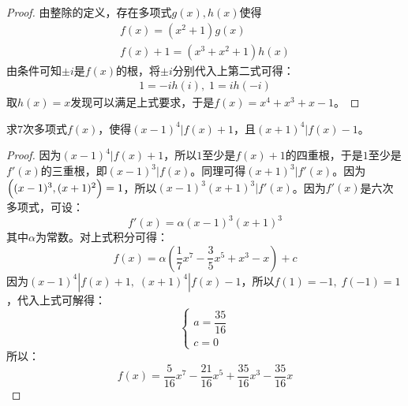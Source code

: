 \begin{proof}
	由整除的定义，存在多项式$g(x),h(x)$使得
	\begin{gather*}
		f(x)=(x^2+1)g(x) \\
		f(x)+1=(x^3+x^2+1)h(x)
	\end{gather*}
	由条件可知$\pm i$是$f(x)$的根，将$\pm i$分别代入上第二式可得：
	\begin{gather*}
		1=-ih(i),\;1=ih(-i)
	\end{gather*}
	取$h(x)=x$发现可以满足上式要求，于是$f(x)=x^4+x^3+x-1$。
\end{proof}
\begin{theorem}
	求$7$次多项式$f(x)$，使得$(x-1)^4|f(x)+1$，且$(x+1)^4|f(x)-1$。
\end{theorem}
\begin{proof}
	因为$(x-1)^4|f(x)+1$，所以$1$至少是$f(x)+1$的四重根，于是$1$至少是$f'(x)$的三重根，即$(x-1)^3|f(x)$。同理可得$(x+1)^3|f'(x)$。因为$\Bigl((x-1)^3,(x+1)^2\Bigr)=1$，所以$(x-1)^3(x+1)^3|f'(x)$。因为$f'(x)$是六次多项式，可设：
	\begin{equation*}
		f'(x)=\alpha(x-1)^3(x+1)^3
	\end{equation*}
	其中$\alpha$为常数。对上式积分可得：
	\begin{equation*}
		f(x)=\alpha\left(\frac{1}{7}x^7-\frac{3}{5}x^5+x^3-x\right)+c
	\end{equation*}
	因为$(x-1)^4|f(x)+1,\;(x+1)^4|f(x)-1$，所以$f(1)=-1,\;f(-1)=1$，代入上式可解得：
	\begin{equation*}
		\begin{cases}
			a=\dfrac{35}{16} \\
			c=0
		\end{cases}
	\end{equation*}
	所以：
	\begin{equation*}
		f(x)=\frac{5}{16}x^7-\frac{21}{16}x^5+\frac{35}{16}x^3-\frac{35}{16}x
	\end{equation*}
\end{proof}